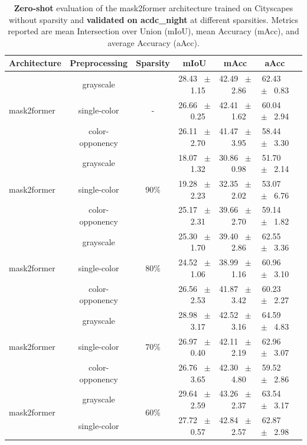 \begin{table}[h]
  \centering
  \caption{\textbf{Zero-shot} evaluation of the mask2former architecture trained on Cityscapes without sparsity and \textbf{validated on acdc_night} at different sparsities. Metrics reported are mean Intersection over Union (mIoU), mean Accuracy (mAcc), and average Accuracy (aAcc).}
  \begin{tabular}{@{}lccc ccc@{}}
    \toprule
    Architecture & Preprocessing & Sparsity & mIoU & mAcc & aAcc \\
    \midrule
    \multirow{3}{*}{mask2former} & grayscale & \multirow{3}{*}{-} & 28.43 ~$\pm$~ 1.15 & 42.49 ~$\pm$~ 2.86 & 62.43 ~$\pm$~ 0.83 \\
    & single-color &  & 26.66 ~$\pm$~ 0.25 & 42.41 ~$\pm$~ 1.62 & 60.04 ~$\pm$~ 2.94 \\
    & color-opponency &  & 26.11 ~$\pm$~ 2.70 & 41.47 ~$\pm$~ 3.95 & 58.44 ~$\pm$~ 3.30 \\
    \midrule
    \multirow{3}{*}{mask2former} & grayscale & \multirow{3}{*}{90\%} & 18.07 ~$\pm$~ 1.32 & 30.86 ~$\pm$~ 0.98 & 51.70 ~$\pm$~ 2.14 \\
    & single-color &  & 19.28 ~$\pm$~ 2.23 & 32.35 ~$\pm$~ 2.02 & 53.07 ~$\pm$~ 6.76 \\
    & color-opponency &  & 25.17 ~$\pm$~ 2.31 & 39.66 ~$\pm$~ 2.70 & 59.14 ~$\pm$~ 1.82 \\
    \midrule
    \multirow{3}{*}{mask2former} & grayscale & \multirow{3}{*}{80\%} & 25.30 ~$\pm$~ 1.70 & 39.40 ~$\pm$~ 2.86 & 62.55 ~$\pm$~ 3.36 \\
    & single-color &  & 24.52 ~$\pm$~ 1.06 & 38.99 ~$\pm$~ 1.16 & 60.96 ~$\pm$~ 3.10 \\
    & color-opponency &  & 26.56 ~$\pm$~ 2.53 & 41.87 ~$\pm$~ 3.42 & 60.23 ~$\pm$~ 2.27 \\
    \midrule
    \multirow{3}{*}{mask2former} & grayscale & \multirow{3}{*}{70\%} & 28.98 ~$\pm$~ 3.17 & 42.52 ~$\pm$~ 3.16 & 64.59 ~$\pm$~ 4.83 \\
    & single-color &  & 26.97 ~$\pm$~ 0.40 & 42.11 ~$\pm$~ 2.19 & 62.96 ~$\pm$~ 3.07 \\
    & color-opponency &  & 26.76 ~$\pm$~ 3.65 & 42.30 ~$\pm$~ 4.80 & 59.52 ~$\pm$~ 2.86 \\
    \midrule
    \multirow{3}{*}{mask2former} & grayscale & \multirow{3}{*}{60\%} & 29.64 ~$\pm$~ 2.59 & 43.26 ~$\pm$~ 2.37 & 63.54 ~$\pm$~ 3.17 \\
    & single-color &  & 27.72 ~$\pm$~ 0.57 & 42.84 ~$\pm$~ 2.57 & 62.87 ~$\pm$~ 2.98 \\

\end{tabular}
\end{table}
